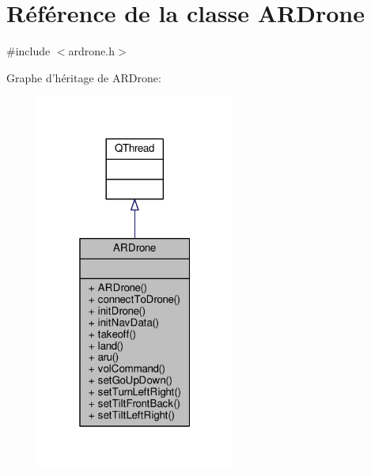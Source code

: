 \hypertarget{class_a_r_drone}{\section{Référence de la classe A\-R\-Drone}
\label{class_a_r_drone}
}


{\ttfamily \#include $<$ardrone.\-h$>$}



Graphe d'héritage de A\-R\-Drone\-:
\nopagebreak
\begin{figure}[H]
\begin{center}
\leavevmode
\includegraphics[width=184pt]{class_a_r_drone__inherit__graph}
\end{center}
\end{figure}



